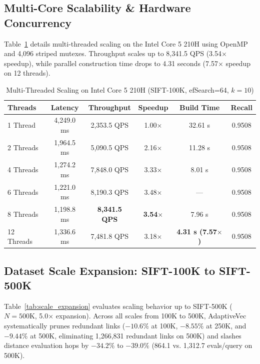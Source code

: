 \documentclass[conference,10pt]{IEEEtran}
\begin{document}
\subsection{Multi-Core Scalability \& Hardware Concurrency}
Table~\ref{tab:multithread} details multi-threaded scaling on the Intel Core 5 210H using OpenMP and 4,096 striped mutexes. Throughput scales up to 8,341.5 QPS (3.54$\times$ speedup), while parallel construction time drops to 4.31 seconds (7.57$\times$ speedup on 12 threads).

\begin{table}[htbp]
\caption{Multi-Threaded Scaling on Intel Core 5 210H (SIFT-100K, efSearch=64, $k=10$)}
\label{tab:multithread}
\centering
\begin{tabular}{lccccc}
\toprule
\textbf{Threads} & \textbf{Latency} & \textbf{Throughput} & \textbf{Speedup} & \textbf{Build Time} & \textbf{Recall} \\
\midrule
1 Thread  & 4,249.0 ms & 2,353.5 QPS & 1.00$\times$ & 32.61 s & 0.9508 \\
2 Threads & 1,964.5 ms & 5,090.5 QPS & 2.16$\times$ & 11.28 s & 0.9508 \\
4 Threads & 1,274.2 ms & 7,848.0 QPS & 3.33$\times$ & 8.01 s & 0.9508 \\
6 Threads & 1,221.0 ms & 8,190.3 QPS & 3.48$\times$ & --- & 0.9508 \\
8 Threads & 1,198.8 ms & \textbf{8,341.5 QPS} & \textbf{3.54$\times$} & 7.96 s & 0.9508 \\
12 Threads & 1,336.6 ms & 7,481.8 QPS & 3.18$\times$ & \textbf{4.31 s (7.57$\times$)} & 0.9508 \\
\bottomrule
\end{tabular}
\end{table}

\subsection{Dataset Scale Expansion: SIFT-100K to SIFT-500K}
Table~\ref{tab:scale_expansion} evaluates scaling behavior up to SIFT-500K ($N=500\text{K}$, 5.0$\times$ expansion). Across all scales from 100K to 500K, AdaptiveVec systematically prunes redundant links ($-10.6\%$ at 100K, $-8.55\%$ at 250K, and $-9.44\%$ at 500K, eliminating 1,266,831 redundant links on 500K) and slashes distance evaluation hops by $-34.2\%$ to $-39.0\%$ (864.1 vs. 1,312.7 evals/query on 500K).
\end{document}
